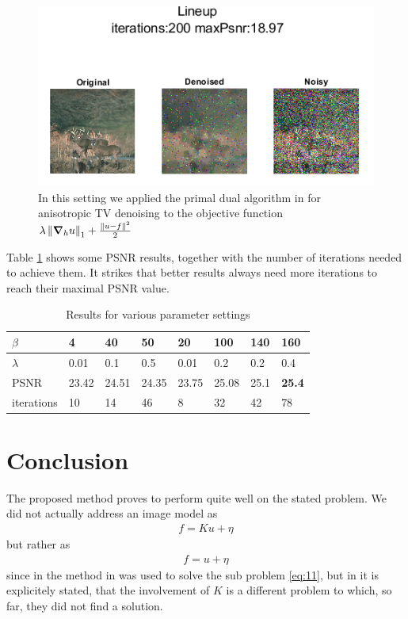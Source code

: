 \begin{figure}[H]
    \centering
    \includegraphics[scale=1]{images/onlyAnisoTv.png}
    \caption{In this setting we applied the primal dual algorithm in \cite{MR2722312} for anisotropic TV denoising to the objective function $\lambda \norm{\grad{u}{h}}_1 + \frac{\norm{u-f}^2}{2}$}
    \label{fig3}
\end{figure}
Table \ref{tab:table1} shows some PSNR results, together with the number of iterations needed to achieve them. It strikes that better results always need more iterations to reach their maximal PSNR value.
\begin{table}[h!]
  \begin{center}
    \label{tab:table1}
    \begin{tabular}{|l|l|l|l|l|l|l|l|}
      \hline
      $\beta$ & 4 & 40 & 50 & 20 & 100 & 140 & 160\\
      \hline
      $\lambda$ & 0.01 & 0.1 & 0.5 & 0.01 & 0.2 & 0.2 & 0.4\\
      \hline
      PSNR & 23.42 & 24.51 & 24.35 & 23.75 & 25.08 & 25.1 & \textbf{25.4}\\
      \hline
      iterations & 10 & 14 & 46 & 8 & 32 & 42 & 78\\
      \hline
    \end{tabular}
    \caption{Results for various parameter settings}
  \end{center}
\end{table}

\section{Conclusion}
The proposed method proves to perform quite well on the stated problem. We did not actually address an image model as 
\begin{align}%
    f = Ku + \eta
\end{align}
but rather as
\begin{align}%
    f = u + \eta
\end{align}
since in \cite{MR3761275} the method in \cite{MR2049783} was used to solve the sub problem \ref{eq:11}, but in \cite{MR2049783} it is explicitely stated, that the involvement of $K$ is a different problem to which, so far, they did not find a solution.